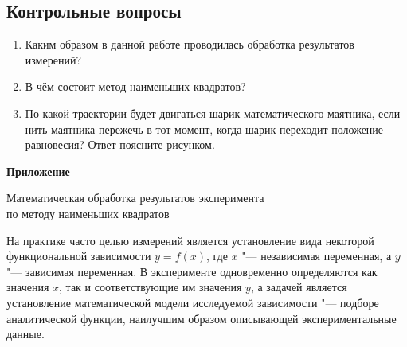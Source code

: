 \documentclass[a4paper, 12pt]{extarticle}
\begin{document}
\subsection{Контрольные вопросы}
\begin{enumerate}
\item Каким образом в данной работе проводилась обработка результатов измерений?
\item В чём состоит метод наименьших квадратов?
\item По какой траектории будет двигаться шарик математического маятника, если нить маятника пережечь в тот момент, когда шарик переходит положение равновесия? Ответ поясните рисунком. %
\end{enumerate}

\newpage

\begin{flushright}
\textbf{Приложение}
\end{flushright}

\vspace{-9pt}

\setcounter{subsection}{-3}
%

\vspace{-9pt}

\begin{center}
\Large Математическая обработка результатов эксперимента \\ \vspace{-4pt}
по методу наименьших квадратов
\end{center}

\bigskip

На практике часто целью измерений является установление вида некоторой функциональной зависимости $y = f(x)$, где $x$ "--- независимая переменная, а $y$ "--- зависимая переменная. В эксперименте одновременно определяются как значения $x$, так и соответствующие им значения $y$, а задачей является установление математической модели исследуемой зависимости "--- подборе аналитической функции, наилучшим образом описывающей экспериментальные данные.
\end{document}
